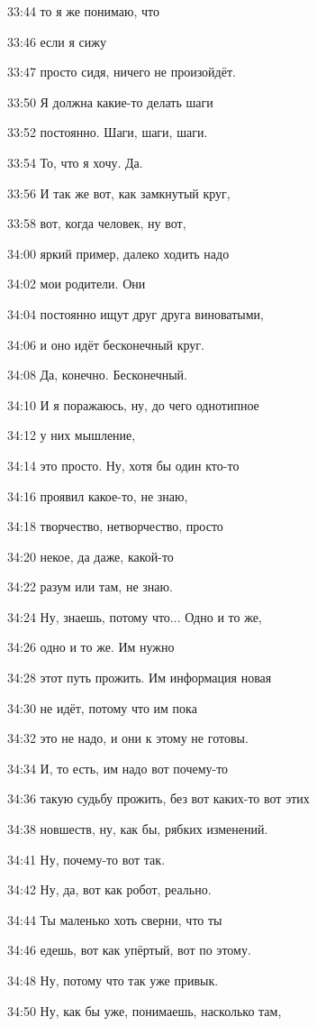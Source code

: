 33:44
то я же понимаю, что

33:46
если я сижу

33:47
просто сидя, ничего не произойдёт.

33:50
Я должна какие-то делать шаги

33:52
постоянно. Шаги, шаги, шаги.

33:54
То, что я хочу. Да.

33:56
И так же вот, как замкнутый круг,

33:58
вот, когда человек, ну вот,

34:00
яркий пример, далеко ходить надо

34:02
мои родители. Они

34:04
постоянно ищут друг друга виноватыми,

34:06
и оно идёт бесконечный круг.

34:08
Да, конечно. Бесконечный.

34:10
И я поражаюсь, ну, до чего однотипное

34:12
у них мышление,

34:14
это просто. Ну, хотя бы один кто-то

34:16
проявил какое-то, не знаю,

34:18
творчество, нетворчество, просто

34:20
некое, да даже, какой-то

34:22
разум или там, не знаю.

34:24
Ну, знаешь, потому что... Одно и то же,

34:26
одно и то же. Им нужно

34:28
этот путь прожить. Им информация новая

34:30
не идёт, потому что им пока

34:32
это не надо, и они к этому не готовы.

34:34
И, то есть, им надо вот почему-то

34:36
такую судьбу прожить, без вот каких-то вот этих

34:38
новшеств, ну, как бы, рябких изменений.

34:41
Ну, почему-то вот так.

34:42
Ну, да, вот как робот, реально.

34:44
Ты маленько хоть сверни, что ты

34:46
едешь, вот как упёртый, вот по этому.

34:48
Ну, потому что так уже привык.

34:50
Ну, как бы уже, понимаешь, насколько там,

